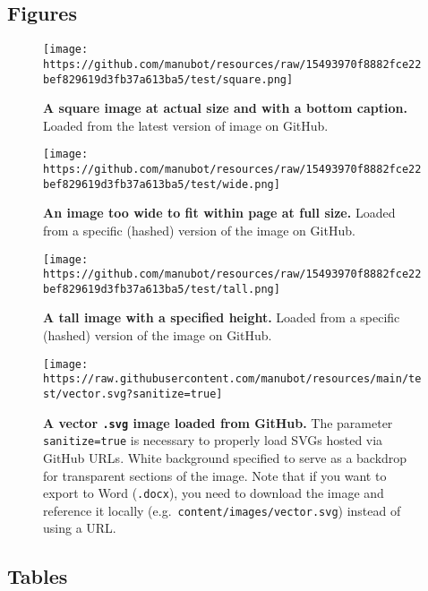 \hypertarget{figures}{%
\subsection{Figures}\label{figures}}

\begin{figure}
\hypertarget{fig:square-image}{%
\centering
\texttt{[image: https://github.com/manubot/resources/raw/15493970f8882fce22bef829619d3fb37a613ba5/test/square.png]}
\caption{\textbf{A square image at actual size and with a bottom caption.}
Loaded from the latest version of image on GitHub.}\label{fig:square-image}
}
\end{figure}

\begin{figure}
\hypertarget{fig:wide-image}{%
\centering
\texttt{[image: https://github.com/manubot/resources/raw/15493970f8882fce22bef829619d3fb37a613ba5/test/wide.png]}
\caption{\textbf{An image too wide to fit within page at full size.}
Loaded from a specific (hashed) version of the image on GitHub.}\label{fig:wide-image}
}
\end{figure}

\begin{figure}
\hypertarget{fig:tall-image}{%
\centering
\texttt{[image: https://github.com/manubot/resources/raw/15493970f8882fce22bef829619d3fb37a613ba5/test/tall.png]}
\caption{\textbf{A tall image with a specified height.}
Loaded from a specific (hashed) version of the image on GitHub.}\label{fig:tall-image}
}
\end{figure}

\begin{figure}
\hypertarget{fig:vector-image}{%
\centering
\texttt{[image: https://raw.githubusercontent.com/manubot/resources/main/test/vector.svg?sanitize=true]}
\caption{\textbf{A vector \texttt{.svg} image loaded from GitHub.}
The parameter \texttt{sanitize=true} is necessary to properly load SVGs hosted via GitHub URLs.
White background specified to serve as a backdrop for transparent sections of the image.
Note that if you want to export to Word (\texttt{.docx}), you need to download the image and reference it locally (e.g.~\texttt{content/images/vector.svg}) instead of using a URL.}\label{fig:vector-image}
}
\end{figure}

\hypertarget{tables}{%
\subsection{Tables}\label{tables}}

